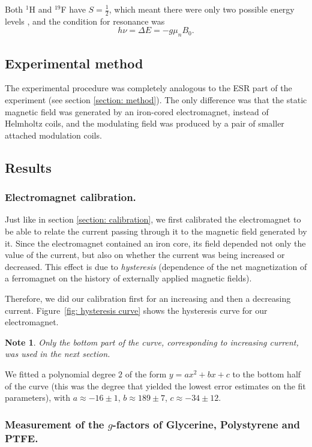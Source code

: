 \documentclass[a4paper]{jpconf}
\numberwithin{equation}{section}
\newtheorem*{note}{Note}
\begin{document}
Both ${}^1$H and ${}^{19}$F have $S = \tfrac{1}{2}$, which meant there were only two possible energy levels \cite{MacLaren, Gero}, and the condition for resonance was 
\begin{equation}\label{eqn: NMR resonance condition}
	h\nu = \Delta E = -g \mu_n B_0.
\end{equation}


\subsection{Experimental method}
The experimental procedure was completely analogous to the ESR part of the experiment (see section \ref{section: method}). The only difference was that the static magnetic field was generated by an iron-cored electromagnet, instead of Helmholtz coils, and the modulating field was produced by a pair of smaller attached modulation coils.


\subsection{Results}
\subsubsection{Electromagnet calibration.}
Just like in section \ref{section: calibration}, we first calibrated the electromagnet to be able to relate the current passing through it to the magnetic field generated by it. Since the electromagnet contained an iron core, its field depended not only the value of the current, but also on whether the current was being increased or decreased. This effect is due to \emph{hysteresis} (dependence of the net magnetization of a ferromagnet on the history of externally applied magnetic fields). 

Therefore, we did our calibration first for an increasing and then a decreasing current. Figure~\ref{fig: hysteresis curve} shows the hysteresis curve for our electromagnet.
\begin{note}
	Only the bottom part of the curve, corresponding to increasing current, was used in the next section.
\end{note}
We fitted a polynomial degree $2$ of the form $y = ax^2 + bx + c$ to the bottom half of the curve (this was the degree that yielded the lowest error estimates on the fit parameters), with $a \approx -16 \pm 1$, $b \approx 189 \pm 7$, $c \approx -34 \pm 12.$

\subsubsection{Measurement of the $g$-factors of Glycerine, Polystyrene and PTFE.}
\end{document}
